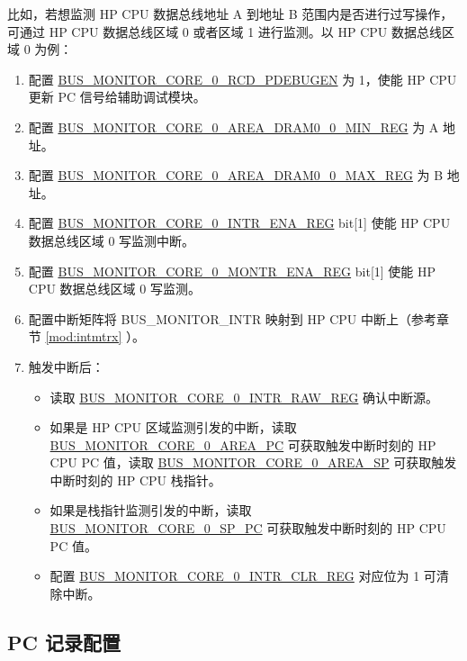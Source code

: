 \documentclass[main\_\_CN.tex]{subfiles}
\begin{document}
比如，若想监测 HP CPU 数据总线地址 A 到地址 B 范围内是否进行过写操作，可通过 HP CPU 数据总线区域 0 或者区域 1 进行监测。以 HP CPU 数据总线区域 0 为例：

\begin{enumerate}
    \item 配置 \hyperref[fielddesc:BUSMONITORCORE0RCDPDEBUGEN]{BUS\_MONITOR\_CORE\_0\_RCD\_PDEBUGEN} 为 1，使能 HP CPU 更新 PC 信号给辅助调试模块。
    \item 配置 \hyperref[regdesc:BUSMONITORCORE0AREADRAM00MINREG]{BUS\_MONITOR\_CORE\_0\_AREA\_DRAM0\_0\_MIN\_REG} 为 A 地址。
    \item 配置 \hyperref[regdesc:BUSMONITORCORE0AREADRAM00MAXREG]{BUS\_MONITOR\_CORE\_0\_AREA\_DRAM0\_0\_MAX\_REG} 为 B 地址。
    \item 配置 \hyperref[regdesc:BUSMONITORCORE0INTRENAREG]{BUS\_MONITOR\_CORE\_0\_INTR\_ENA\_REG} bit[1] 使能 HP CPU 数据总线区域 0 写监测中断。
    \item 配置 \hyperref[regdesc:BUSMONITORCORE0MONTRENAREG]{BUS\_MONITOR\_CORE\_0\_MONTR\_ENA\_REG} bit[1] 使能 HP CPU 数据总线区域 0 写监测。
    \item 配置中断矩阵将 BUS\_MONITOR\_INTR 映射到 HP CPU 中断上（参考章节 \ref{mod:intmtrx} \textit{}）。
    \item 触发中断后：
        \begin{itemize}
            \item 读取 \hyperref[regdesc:BUSMONITORCORE0INTRRAWREG]{BUS\_MONITOR\_CORE\_0\_INTR\_RAW\_REG} 确认中断源。
            \item 如果是 HP CPU 区域监测引发的中断，读取 \hyperref[fielddesc:BUSMONITORCORE0AREAPC]{BUS\_MONITOR\_CORE\_0\_AREA\_PC} 可获取触发中断时刻的 HP CPU PC 值，读取 \hyperref[fielddesc:BUSMONITORCORE0AREASP]{BUS\_MONITOR\_CORE\_0\_AREA\_SP} 可获取触发中断时刻的 HP CPU 栈指针。
            \item 如果是栈指针监测引发的中断，读取 \hyperref[fielddesc:BUSMONITORCORE0SPPC]{BUS\_MONITOR\_CORE\_0\_SP\_PC} 可获取触发中断时刻的 HP CPU PC 值。
            \item 配置 \hyperref[regdesc:BUSMONITORCORE0INTRCLRREG]{BUS\_MONITOR\_CORE\_0\_INTR\_CLR\_REG} 对应位为 1 可清除中断。
        \end{itemize}
\end{enumerate}

\subsection{PC 记录配置}
\end{document}
